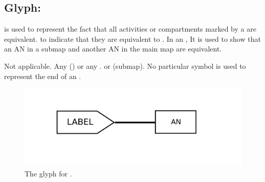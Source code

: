 
\subsection{Glyph:  }\label{sec:equivalenceArc}

 is used to represent the fact that all activities or compartments marked by a  are equivalent. to indicate that they are equivalent to . In an \AFm, It is used to show that an AN in a submap and another AN in the main map are equivalent.

\begin{glyphDescription}
 \glyphSboTerm Not applicable.
 \glyphOrigin Any  () or any .
 \glyphTarget {} or  (submap).
 \glyphEndPoint No particular symbol is used to represent the end of an .
 \end{glyphDescription}

\begin{figure}[H]
  \centering
  \includegraphics[scale = 0.4]{images/equivalence}
  \caption{The \AF glyph for .}
  \label{fig:equivalence}
\end{figure}
